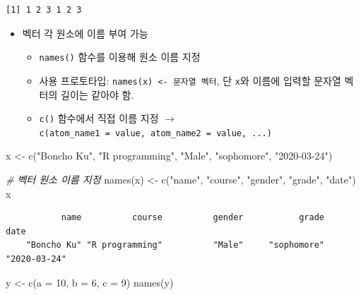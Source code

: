 \documentclass[
  11pt,
]{krantz}
\newenvironment{Shaded}{\begin{snugshade}}{\end{snugshade}}
\newcommand{\AttributeTok}[1]{\textcolor[rgb]{0.61,0.61,0.61}{#1}}
\newcommand{\CommentTok}[1]{\textcolor[rgb]{0.37,0.37,0.37}{\textit{#1}}}
\newcommand{\DecValTok}[1]{\textcolor[rgb]{0.06,0.06,0.06}{#1}}
\newcommand{\FunctionTok}[1]{\textcolor[rgb]{0,0,0}{#1}}
\newcommand{\NormalTok}[1]{#1}
\newcommand{\OtherTok}[1]{\textcolor[rgb]{0.37,0.37,0.37}{#1}}
\newcommand{\StringTok}[1]{\textcolor[rgb]{0.5,0.5,0.5}{#1}}
\providecommand{\tightlist}{%
  \setlength{\itemsep}{0pt}\setlength{\parskip}{0pt}}
\begin{document}
\begin{verbatim}
[1] 1 2 3 1 2 3
\end{verbatim}

\normalsize

\begin{itemize}
\tightlist
\item
  벡터 각 원소에 이름 부여 가능

  \begin{itemize}
  \tightlist
  \item
    \texttt{names()} 함수를 이용해 원소 이름 지정
  \item
    사용 프로토타입: \texttt{names(x)\ \textless{}-\ 문자열\ 벡터}, 단 \texttt{x}와 이름에 입력할 문자열 벡터의 길이는 같아야 함.
  \item
    \texttt{c()} 함수에서 직접 이름 지정 \(\rightarrow\) \texttt{c(atom\_name1\ =\ value,\ atom\_name2\ =\ value,\ ...)}
  \end{itemize}
\end{itemize}

\footnotesize

\begin{Shaded}
\begin{Highlighting}[]
\NormalTok{x }\OtherTok{\textless{}{-}} \FunctionTok{c}\NormalTok{(}\StringTok{"Boncho Ku"}\NormalTok{, }\StringTok{"R programming"}\NormalTok{, }\StringTok{"Male"}\NormalTok{, }\StringTok{"sophomore"}\NormalTok{, }\StringTok{"2020{-}03{-}24"}\NormalTok{)}

\CommentTok{\# 벡터 원소 이름 지정}
\FunctionTok{names}\NormalTok{(x) }\OtherTok{\textless{}{-}} \FunctionTok{c}\NormalTok{(}\StringTok{"name"}\NormalTok{, }\StringTok{"course"}\NormalTok{, }\StringTok{"gender"}\NormalTok{, }\StringTok{"grade"}\NormalTok{, }\StringTok{"date"}\NormalTok{) }
\NormalTok{x}
\end{Highlighting}
\end{Shaded}

\begin{verbatim}
           name          course          gender           grade            date 
    "Boncho Ku" "R programming"          "Male"     "sophomore"    "2020-03-24" 
\end{verbatim}

\begin{Shaded}
\begin{Highlighting}[]
\NormalTok{y }\OtherTok{\textless{}{-}} \FunctionTok{c}\NormalTok{(}\AttributeTok{a =} \DecValTok{10}\NormalTok{, }\AttributeTok{b =} \DecValTok{6}\NormalTok{, }\AttributeTok{c =} \DecValTok{9}\NormalTok{)}
\FunctionTok{names}\NormalTok{(y)}
\end{Highlighting}
\end{Shaded}
\end{document}

